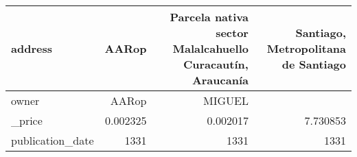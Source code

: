 \begin{table}[H]
\begin{tabular}{|l|r|r|r|}
\hline address & \cellcolor[rgb]{0.9, 0.54, 0.52} AARop & Parcela nativa sector Malalcahuello Curacautín, Araucanía &  Santiago, Metropolitana de Santiago \\
\hline owner & \cellcolor[rgb]{0.9, 0.54, 0.52} AARop &  MIGUEL &    \\
\hline \_price & \cellcolor[rgb]{0.9, 0.54, 0.52} 0.002325 & \cellcolor[rgb]{0.9, 0.54, 0.52} 0.002017 & 7.730853 \\
\hline publication\_date & \cellcolor[rgb]{0.9, 0.54, 0.52} 1331 & \cellcolor[rgb]{0.9, 0.54, 0.52} 1331 & \cellcolor[rgb]{0.9, 0.54, 0.52} 1331 \\
\hline
\end{tabular}
\end{table}
